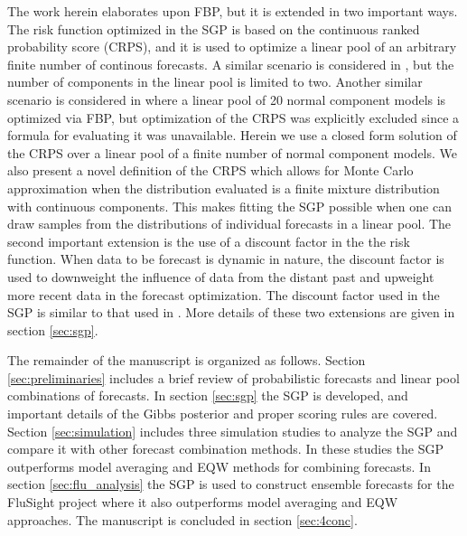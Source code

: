 The work herein elaborates upon FBP, but it is extended in two important ways.
The risk function optimized in the SGP is based on the continuous ranked 
probability score (CRPS), and it is used to optimize a linear pool of 
an arbitrary finite number of continous forecasts. 
A similar scenario is considered in \cite[]{loaiza2021focused}, 
but the number of components in the 
linear pool is limited to two. Another similar scenario is considered in
\cite[]{frazier2025loss} where a linear pool of 20 normal component models is
optimized via FBP, but optimization of the CRPS was explicitly excluded 
since a formula for evaluating it was unavailable. 
Herein we use a closed form
solution of the CRPS over a linear pool of a finite number of normal component
models. We also present a novel definition of the CRPS which allows for
Monte Carlo approximation when the distribution evaluated is a finite mixture
distribution with continuous components. This makes fitting the SGP possible
when one can draw samples from the distributions of individual forecasts
in a linear pool.
The second important extension is the use of a discount factor in the the risk
function. When data to be forecast is dynamic in nature, the discount factor
is used to downweight the influence of data from the distant past and 
upweight more recent data in the forecast optimization. The discount factor
used in the SGP is similar to that used in 
\cite[]{bernaciak2024loss,koop2013large, raftery2010online}.
More details of these two extensions are given in section \ref{sec:sgp}.

The remainder of the manuscript is organized as follows.
Section \ref{sec:preliminaries} includes a brief 
review of probabilistic forecasts and linear pool combinations of forecasts. 
In section \ref{sec:sgp} the SGP is developed, and important details of the 
Gibbs posterior and proper scoring rules are covered. Section 
\ref{sec:simulation} includes three simulation studies to analyze the SGP and 
compare it with other forecast combination methods. In these studies the SGP 
outperforms model averaging and EQW methods for combining forecasts. In section
\ref{sec:flu_analysis} the SGP is used to construct ensemble forecasts for the 
FluSight project where it also outperforms model averaging and EQW approaches. 
The manuscript is concluded in section \ref{sec:4conc}. 




